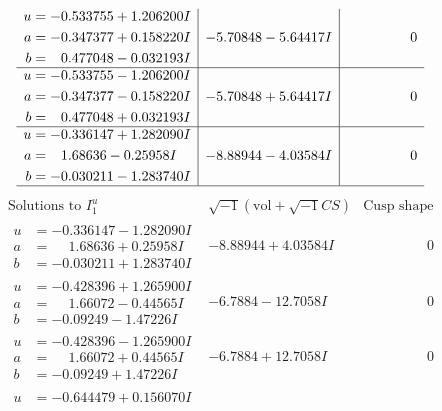 \documentclass[1p]{elsarticle_modified}
\theoremstyle{definition}
\newcommand{\I}{\sqrt{-1}}
\begin{document}
$$\begin{array}{c|c|c}
\begin{aligned}
u &= -0.533755 + 1.206200 I \\
a &= -0.347377 + 0.158220 I \\
b &= \phantom{-}0.477048 - 0.032193 I\end{aligned}
 & -5.70848 - 5.64417 I & \phantom{-0.000000 } 0 \\ \hline\begin{aligned}
u &= -0.533755 - 1.206200 I \\
a &= -0.347377 - 0.158220 I \\
b &= \phantom{-}0.477048 + 0.032193 I\end{aligned}
 & -5.70848 + 5.64417 I & \phantom{-0.000000 } 0 \\ \hline\begin{aligned}
u &= -0.336147 + 1.282090 I \\
a &= \phantom{-}1.68636 - 0.25958 I \\
b &= -0.030211 - 1.283740 I\end{aligned}
 & -8.88944 - 4.03584 I & \phantom{-0.000000 } 0\\
 \hline 
 \end{array}$$\newpage$$\begin{array}{c|c|c}  
\text{Solutions to }I^u_{1}& \I (\text{vol} + \sqrt{-1}CS) & \text{Cusp shape}\\
 \hline 
\begin{aligned}
u &= -0.336147 - 1.282090 I \\
a &= \phantom{-}1.68636 + 0.25958 I \\
b &= -0.030211 + 1.283740 I\end{aligned}
 & -8.88944 + 4.03584 I & \phantom{-0.000000 } 0 \\ \hline\begin{aligned}
u &= -0.428396 + 1.265900 I \\
a &= \phantom{-}1.66072 - 0.44565 I \\
b &= -0.09249 - 1.47226 I\end{aligned}
 & -6.7884 - 12.7058 I & \phantom{-0.000000 } 0 \\ \hline\begin{aligned}
u &= -0.428396 - 1.265900 I \\
a &= \phantom{-}1.66072 + 0.44565 I \\
b &= -0.09249 + 1.47226 I\end{aligned}
 & -6.7884 + 12.7058 I & \phantom{-0.000000 } 0 \\ \hline\begin{aligned}
u &= -0.644479 + 0.156070 I \\

\end{aligned}
\end{array}$$
\end{document}

